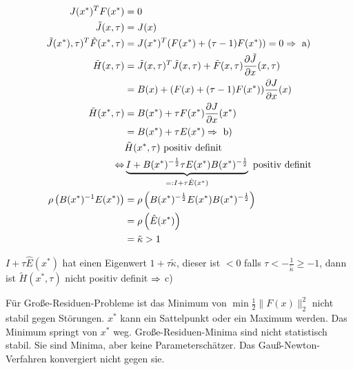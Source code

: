 \begin{align*}
J(x^*)^T F(x^*) &= 0 \\
\tilde J(x,\tau) &= J(x) \\
\tilde J(x^*), \tau)^T \tilde F(x^*, \tau) &= J(x^*)^T ( F(x^*) + (\tau-1) F(x^*)) = 0 \Rightarrow \text{ a)} \\
\tilde H(x,\tau) &= \tilde J(x,\tau)^T \tilde J(x,\tau)  + \tilde F(x,\tau) \frac{\partial \tilde J}{\partial x} (x,\tau) \\
&= B(x) + (F(x) + (\tau-1) F(x^*)) \frac{\partial J}{\partial x}(x) \\
\tilde H(x^*,\tau) &= B(x^*) + \tau F(x^*) \frac{\partial J}{\partial x}(x^*) \\
&= B(x^*) + \tau E(x^*) \Rightarrow \text{ b)} \\
& \tilde H(x^*, \tau) \text{ positiv definit} \\
\Leftrightarrow & \underbrace{I + B(x^*)^{-\frac 12} \tau E(x^*) B(x^*)^{-\frac 12}}_{=: I + \tau \hat E(x^*)} \text{ positiv definit} \\
\rho\left( B(x^*)^{-1} E(x^*)\right) &= \rho\left( B(x^*)^{-\frac 12} E(x^*) B(x^*)^{-\frac 12} \right) \\
&= \rho \left( \hat E(x^*) \right) \\
&= \tilde \kappa > 1 \\
\end{align*}

$I+\tau \hat E(x^*)$ hat einen Eigenwert $1+\tau \tilde \kappa$, dieser ist $<0$ falls $\tau < - \frac{1}{\tilde \kappa} \geq -1$, dann ist $\tilde H(x^*,\tau)$ nicht positiv definit $\Rightarrow$ c)


Für Große-Residuen-Probleme ist das Minimum von $\min \frac 12 \|F(x)\|_2^2$ nicht stabil gegen Störungen. $x^*$ kann ein Sattelpunkt oder ein Maximum werden. Das Minimum springt von $x^*$ weg. Große-Residuen-Minima sind nicht statistisch stabil. Sie sind Minima, aber keine Parameterschätzer. Das Gauß-Newton-Verfahren konvergiert nicht gegen sie.























































